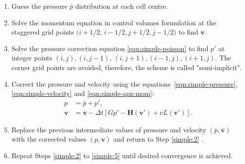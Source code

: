 \documentclass{article}
\begin{document}
\begin{enumerate}
	\item \label{simple:1} Guess the pressure $\bar{p}$ distribution at each cell centre.
	\item \label{simple:2} Solve the momentum equation in control volumes formulation at the staggered grid points $(i+1 / 2$, $i-1 / 2, j+1 / 2, j-1 / 2)$ to find $\boldsymbol{\bar v}$.
	\item \label{simple:3} Solve the pressure correction equation \eqref{eqn:simple-poisson} to find $p'$ at integer points $(i, j),(i, j-1)$, $(i, j+1),(i-1, j),(i+1, j)$. The corner grid points are avoided, therefore, the scheme is called "semi-implicit".
	\item \label{simple:4} Correct the pressure and velocity using the equations~\eqref{eqn:simple-pressure},\eqref{eqn:simple-velocity} and \eqref{eqn:simple-apx-mom}:
		\begin{equation}
			\begin{aligned}
				p&=\bar p + p',\\
				\boldsymbol{v}&=\boldsymbol{\bar v}-\Delta t\left[Gp'-\mathbf{H}(\boldsymbol{v}')+\nu L(\boldsymbol{v}')\right].
			\end{aligned}
		\end{equation}
	\item \label{simple:5} Replace the previous intermediate values of pressure and velocity $\left(\bar{p}, \boldsymbol{\bar{v}}\right)$ with the corrected values $\left(p, \boldsymbol{v}\right)$ and return to Step \ref{simple:2} .
	\item \label{simple:6} Repeat Steps \ref{simple:2} to \ref{simple:5} until desired convergence is achieved.
\end{enumerate}
\end{document}
